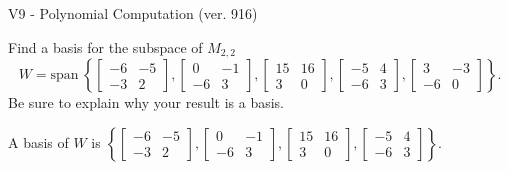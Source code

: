\begin{exercise}
  \begin{exerciseTitle}V9 - Polynomial Computation (ver. 916)\end{exerciseTitle}
  \begin{exerciseStatement}
    Find a basis for the subspace of \(M_{2,2}\) 
\[W=\mathrm{span}\ \left\{\left[\begin{array}{cc}
-6 & -5 \\
-3 & 2
\end{array}\right] , \left[\begin{array}{cc}
0 & -1 \\
-6 & 3
\end{array}\right] , \left[\begin{array}{cc}
15 & 16 \\
3 & 0
\end{array}\right] , \left[\begin{array}{cc}
-5 & 4 \\
-6 & 3
\end{array}\right] , \left[\begin{array}{cc}
3 & -3 \\
-6 & 0
\end{array}\right]\right\}.\]
 Be sure to explain why your result is a basis.


  \end{exerciseStatement}
  \begin{exerciseAnswer}
   A basis of \(W\) is  \(\left\{\left[\begin{array}{cc}
-6 & -5 \\
-3 & 2
\end{array}\right] , \left[\begin{array}{cc}
0 & -1 \\
-6 & 3
\end{array}\right] , \left[\begin{array}{cc}
15 & 16 \\
3 & 0
\end{array}\right] , \left[\begin{array}{cc}
-5 & 4 \\
-6 & 3
\end{array}\right]\right\}\).
  


  \end{exerciseAnswer}
\end{exercise}